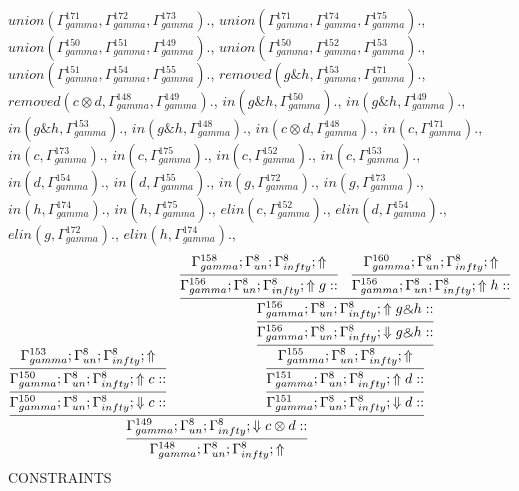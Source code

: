 \documentclass[a4paper, 11pt]{article}
\begin{document}
$union(\Gamma_{gamma}^{171}, \Gamma_{gamma}^{172}, \Gamma_{gamma}^{173}).$, $union(\Gamma_{gamma}^{171}, \Gamma_{gamma}^{174}, \Gamma_{gamma}^{175}).$, $union(\Gamma_{gamma}^{150}, \Gamma_{gamma}^{151}, \Gamma_{gamma}^{149}).$, $union(\Gamma_{gamma}^{150}, \Gamma_{gamma}^{152}, \Gamma_{gamma}^{153}).$, $union(\Gamma_{gamma}^{151}, \Gamma_{gamma}^{154}, \Gamma_{gamma}^{155}).$, $removed(g \binampersand h, \Gamma_{gamma}^{153}, \Gamma_{gamma}^{171}).$, $removed(c \otimes d, \Gamma_{gamma}^{148}, \Gamma_{gamma}^{149}).$, $in(g \binampersand h, \Gamma_{gamma}^{150}).$, $in(g \binampersand h, \Gamma_{gamma}^{149}).$, $in(g \binampersand h, \Gamma_{gamma}^{153}).$, $in(g \binampersand h, \Gamma_{gamma}^{148}).$, $in(c \otimes d, \Gamma_{gamma}^{148}).$, $in(c, \Gamma_{gamma}^{171}).$, $in(c, \Gamma_{gamma}^{173}).$, $in(c, \Gamma_{gamma}^{175}).$, $in(c, \Gamma_{gamma}^{152}).$, $in(c, \Gamma_{gamma}^{153}).$, $in(d, \Gamma_{gamma}^{154}).$, $in(d, \Gamma_{gamma}^{155}).$, $in(g, \Gamma_{gamma}^{172}).$, $in(g, \Gamma_{gamma}^{173}).$, $in(h, \Gamma_{gamma}^{174}).$, $in(h, \Gamma_{gamma}^{175}).$, $elin(c, \Gamma_{gamma}^{152}).$, $elin(d, \Gamma_{gamma}^{154}).$, $elin(g, \Gamma_{gamma}^{172}).$, $elin(h, \Gamma_{gamma}^{174}).$, 
{\small
\[
\infer{\Gamma_{ gamma}^{148} ; \Gamma_{un}^{8} ; \Gamma_{ infty}^{8} ;  \Uparrow }
{\infer{\Gamma_{ gamma}^{149} ; \Gamma_{un}^{8} ; \Gamma_{ infty}^{8} ;  \Downarrow c \otimes d :: }
{\infer{\Gamma_{ gamma}^{150} ; \Gamma_{un}^{8} ; \Gamma_{ infty}^{8} ;  \Downarrow c :: }
{\infer{\Gamma_{ gamma}^{150} ; \Gamma_{un}^{8} ; \Gamma_{ infty}^{8} ;  \Uparrow c :: }
{\Gamma_{ gamma}^{153} ; \Gamma_{un}^{8} ; \Gamma_{ infty}^{8} ;  \Uparrow }}
&
\infer{\Gamma_{ gamma}^{151} ; \Gamma_{un}^{8} ; \Gamma_{ infty}^{8} ;  \Downarrow d :: }
{\infer{\Gamma_{ gamma}^{151} ; \Gamma_{un}^{8} ; \Gamma_{ infty}^{8} ;  \Uparrow d :: }
{\infer{\Gamma_{ gamma}^{155} ; \Gamma_{un}^{8} ; \Gamma_{ infty}^{8} ;  \Uparrow }
{\infer{\Gamma_{ gamma}^{156} ; \Gamma_{un}^{8} ; \Gamma_{ infty}^{8} ;  \Downarrow g \binampersand h :: }
{\infer{\Gamma_{ gamma}^{156} ; \Gamma_{un}^{8} ; \Gamma_{ infty}^{8} ;  \Uparrow g \binampersand h :: }
{\infer{\Gamma_{ gamma}^{156} ; \Gamma_{un}^{8} ; \Gamma_{ infty}^{8} ;  \Uparrow g :: }
{\Gamma_{ gamma}^{158} ; \Gamma_{un}^{8} ; \Gamma_{ infty}^{8} ;  \Uparrow }
&
\infer{\Gamma_{ gamma}^{156} ; \Gamma_{un}^{8} ; \Gamma_{ infty}^{8} ;  \Uparrow h :: }
{\Gamma_{ gamma}^{160} ; \Gamma_{un}^{8} ; \Gamma_{ infty}^{8} ;  \Uparrow }}}}}}}}
\]
}
CONSTRAINTS
\end{document}

